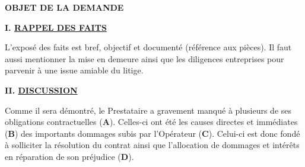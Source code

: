 \documentclass[12pt,a4paper]{article}
\newenvironment{changemargin}[2]{%
\begin{list}{}{%
\setlength{\topsep}{0pt}%
\setlength{\leftmargin}{#1}%
\setlength{\rightmargin}{#2}%
\setlength{\listparindent}{\parindent}%
\setlength{\itemindent}{\parindent}%
\setlength{\parsep}{\parskip}
}%
\item[]}{\end{list}}
\begin{document}


\pagebreak

\begin{center}
\Large{\textbf{OBJET DE LA DEMANDE}}
\end{center}


\vspace{05mm}

\begin{changemargin}{0.1cm}{0.1cm}
\textbf{\large{I. \underline{RAPPEL DES FAITS}}}
\end{changemargin}
\vspace{05mm}

L'exposé des faits est bref, objectif et documenté (référence aux pièces). Il faut aussi mentionner la mise en demeure ainsi que les diligences entreprises pour parvenir à une issue amiable du litige.\\

\lipsum[4]

\vspace{08mm}

\begin{changemargin}{0.1cm}{0.1cm}
\textbf{\large{II. \underline{DISCUSSION}}}
\end{changemargin}
\vspace{05mm}

Comme il sera démontré, le Prestataire a gravement manqué à plusieurs de ses obligations contractuelles (\textbf{A}). Celles-ci ont été les causes directes et immédiates (\textbf{B}) des importants dommages subis par l'Opérateur (\textbf{C}). Celui-ci est donc fondé à solliciter la résolution du contrat ainsi que l'allocation de dommages et intérêts en réparation de son préjudice (\textbf{D}).
\vspace{08mm}

\begin{changemargin}{1cm}{0.1cm}
\end{changemargin}
\vspace{05mm}
\end{document}
